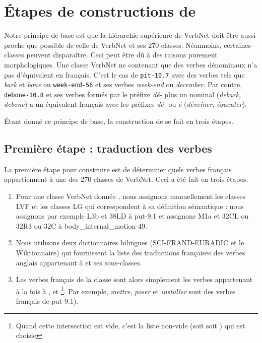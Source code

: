 \section{Étapes de constructions de \verbenet{}}

Notre principe de base est que la hiérarchie supérieure de VerbNet doit être
aussi proche que possible de celle de VerbNet et ses 270 classes. Néanmoins,
certaines classes peuvent disparaître. Ceci peut être dû à des raisons purement
morphologiques. Une classe VerbNet ne contenant que des verbes dénominaux n'a
pas d'équivalent en français. C'est le cas de \texttt{pit-10.7} avec des verbes
tels que \emph{bark} et \emph{bone} ou \texttt{week-end-56} et ses verbes
\emph{week-end} ou \emph{december}. Par contre, \texttt{debone-10.8} et ses
verbes formés par le préfixe \emph{dé-} plus un nominal (\emph{debark, debone})
a un équivalent français avec les préfixes \emph{dé-} ou \emph{é}
(\emph{déveiner}, \emph{équeuter}).

Étant donné ce principe de base, la construction de \verbenet{} se fait en
trois étapes.

\subsection{Première étape : traduction des verbes}\label{first}

La première étape pour construire \verbenet{} est de déterminer quels verbes
français appartiennent à une des 270 classes de VerbNet. Ceci a été fait en
trois étapes.

\begin{enumerate}

    \item Pour une classe VerbNet donnée \Ce{}, nous assignons manuellement les
        classes LVF \Clvf{} et les classes LG \Clg{} qui correspondent à sa
        définition sémantique : nous assignons par exemple {\color{red}L3b} et
        {\color{green}38LD} à {\color{blue}put-9.1} et assignons
        {\color{red}M1a} et {\color{green}32CL ou 32R3 ou 32C} à
        {\color{blue}body\_internal\_motion-49}.

    \item Nous utilisons deux dictionnaires bilingues (SCI-FRAND-EURADIC et le
        Wiktionnaire) qui fournissent la liste \Ltrad{} des traductions
        françaises des verbes anglais appartenant à \Ce{} et ses sous-classes.

    \item Les verbes français de la classe \Ce{} sont alors simplement les
        verbes appartenant à la fois à \Ltrad{}, \Clvf{} et
        \Clg{}\footnote{Quand cette intersection est vide, c'est la liste
        non-vide (soit \Clvf{} soit \Clg{}) qui est choisie}. Par exemple,
        \emph{mettre}, \emph{poser} et \emph{installer} sont des verbes
        français de {\color{blue}put-9.1}).

\end{enumerate}

